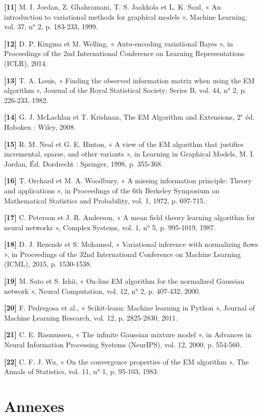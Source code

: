 \textbf{[11]  }M. I. Jordan, Z. Ghahramani, T. S. Jaakkola et L. K. Saul, « An introduction to variational methods for graphical models », Machine Learning, vol. 37, n° 2, p. 183-233, 1999.

\textbf{[12]  }D. P. Kingma et M. Welling, « Auto-encoding variational Bayes », in Proceedings of the 2nd International Conference on Learning Representations (ICLR), 2014.

\textbf{[13]  }T. A. Louis, « Finding the observed information matrix when using the EM algorithm », Journal of the Royal Statistical Society: Series B, vol. 44, n° 2, p. 226-233, 1982.

\textbf{[14]  }G. J. McLachlan et T. Krishnan, The EM Algorithm and Extensions, 2$^{e}$ éd. Hoboken : Wiley, 2008.

\textbf{[15]  }R. M. Neal et G. E. Hinton, « A view of the EM algorithm that justifies incremental, sparse, and other variants », in Learning in Graphical Models, M. I. Jordan, Éd. Dordrecht : Springer, 1998, p. 355-368.

\textbf{[16]  }T. Orchard et M. A. Woodbury, « A missing information principle: Theory and applications », in Proceedings of the 6th Berkeley Symposium on Mathematical Statistics and Probability, vol. 1, 1972, p. 697-715.

\textbf{[17]  }C. Peterson et J. R. Anderson, « A mean field theory learning algorithm for neural networks », Complex Systems, vol. 1, n° 5, p. 995-1019, 1987.

\textbf{[18]  }D. J. Rezende et S. Mohamed, « Variational inference with normalizing flows », in Proceedings of the 32nd International Conference on Machine Learning (ICML), 2015, p. 1530-1538.

\textbf{[19]  }M. Sato et S. Ishii, « On-line EM algorithm for the normalized Gaussian network », Neural Computation, vol. 12, n° 2, p. 407-432, 2000.

\textbf{[20]  }F. Pedregosa et al., « Scikit-learn: Machine learning in Python », Journal of Machine Learning Research, vol. 12, p. 2825-2830, 2011.

\textbf{[21]  }C. E. Rasmussen, « The infinite Gaussian mixture model », in Advances in Neural Information Processing Systems (NeurIPS), vol. 12, 2000, p. 554-560.

\textbf{[22]  }C. F. J. Wu, « On the convergence properties of the EM algorithm », The Annals of Statistics, vol. 11, n° 1, p. 95-103, 1983.


\chapter*{Annexes}
